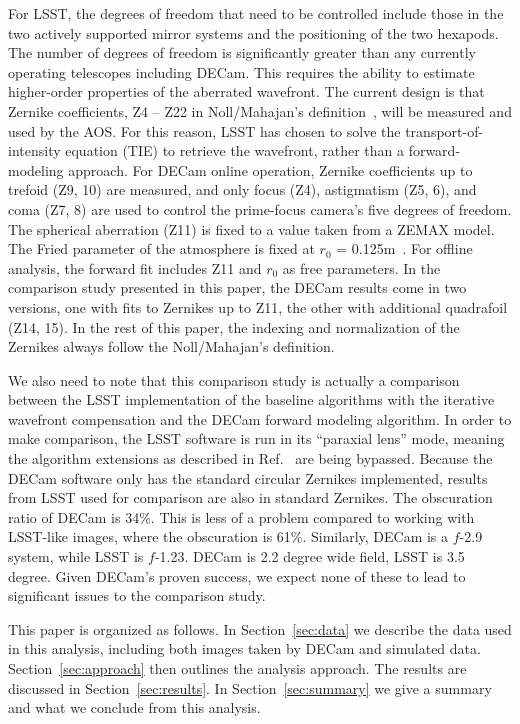 \documentclass[]{spie}  %
\begin{document}
For LSST, the degrees of freedom that need to be controlled include those in the two actively supported mirror systems and the positioning of the two hexapods.
The number of degrees of freedom is significantly greater than any currently operating telescopes including DECam.
This requires the ability to estimate higher-order properties of the aberrated wavefront.
The current design is that Zernike coefficients, Z4 -- Z22 
in Noll/Mahajan's definition~\cite{standardZ, annularZ}, will be measured and used by the AOS.
For this reason, LSST has chosen to solve the transport-of-intensity equation (TIE) to retrieve the wavefront, rather than a forward-modeling approach.
For DECam online operation, Zernike coefficients up to trefoid (Z9, 10) are measured, and only focus (Z4), astigmatism (Z5, 6), and coma (Z7, 8) are used to control the prime-focus camera's five degrees of freedom. 
The spherical aberration (Z11) is fixed to a value taken from a ZEMAX model. The Fried parameter of the atmosphere is fixed at $r_0$ = 0.125m~\cite{roodman14}.
For offline analysis, the forward fit includes Z11 and $r_0$ as free parameters.
In the comparison study presented in this paper, the DECam results come in two versions, one with fits to Zernikes up to Z11, the other with additional quadrafoil (Z14, 15).
In the rest of this paper, the indexing and normalization of the Zernikes always follow
the Noll/Mahajan's definition.

We also need to note that this comparison study is actually a comparison between the LSST implementation of the baseline algorithms with the iterative wavefront compensation and the DECam forward modeling algorithm.
In order to make comparison, the LSST software is run in its ``paraxial lens'' mode, meaning the algorithm extensions as described in Ref.~ are being bypassed. 
Because the DECam software only has the standard circular Zernikes implemented, results from LSST used for comparison are also in standard Zernikes. The obscuration ratio of DECam is 34\%. This is less of a problem compared to working with LSST-like images, where the obscuration is 61\%. 
Similarly, DECam is a $f$-2.9 system, while LSST is $f$-1.23. DECam is 2.2 degree wide field, LSST is 3.5 degree.
Given DECam's proven success, we expect none of these to lead to significant issues to the comparison study.

This paper is organized as follows.
In Section~\ref{sec:data} we describe the data used in this analysis, including both images taken by DECam and simulated data.
Section~\ref{sec:approach} then outlines the analysis approach.
The results are discussed in Section~\ref{sec:results}.
In Section~\ref{sec:summary} we give a summary and what we conclude from this analysis.
\end{document}
